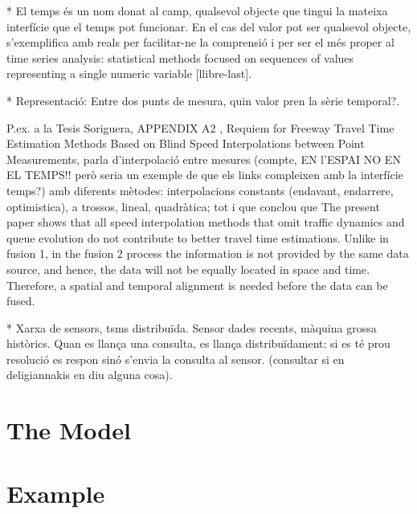 \documentclass[
english
]{scrartcl}
\begin{document}
* El temps és un nom donat al camp, qualsevol objecte que tingui la mateixa interfície que el temps pot funcionar. En el cas del valor pot ser qualsevol objecte, s'exemplifica amb reals per facilitar-ne la comprensió i per ser el més proper al time series analysis: statistical methods focused on sequences of values representing a single numeric variable [llibre-last].


* Representació: Entre dos punts de mesura, quin valor pren la sèrie temporal?.





 P.ex. a la Tesis Soriguera, APPENDIX A2 , 
Requiem for Freeway Travel Time Estimation Methods Based
on Blind Speed Interpolations between Point Measurements, parla d'interpolació entre mesures (compte, EN l'ESPAI NO EN EL TEMPS!! però seria un exemple de que els links compleixen amb la interfície temps?) amb diferents mètodes:  interpolacions constants (endavant, endarrere, optimistica), a trossos, lineal, quadràtica;    tot i que conclou que The present paper shows that all speed interpolation methods that omit traffic
dynamics and queue evolution do not contribute to better travel time estimations. 
Unlike in fusion 1, in the fusion 2 process the information is not provided by the same
data source, and hence, the data will not be equally located in space and time. 
Therefore, a spatial and temporal alignment is needed before the data can be fused.


* Xarxa de sensors, tsms distribuïda. Sensor dades recents, màquina grossa històrics. Quan es llança una consulta, es llança distribuïdament: si es té prou resolució es respon sinó s'envia la consulta al sensor. (consultar si en deligiannakis en diu alguna cosa).








\section{The Model}










\section{Example}
\end{document}
